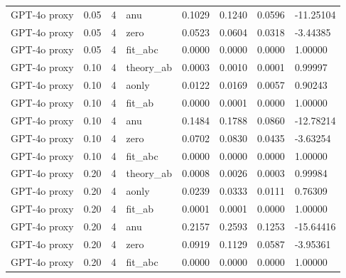\begin{tabular}{llllllll}
GPT-4o proxy & 0.05 & 4 & anu & 0.1029 & 0.1240 & 0.0596 & -11.25104 \\
GPT-4o proxy & 0.05 & 4 & zero & 0.0523 & 0.0604 & 0.0318 & -3.44385 \\
GPT-4o proxy & 0.05 & 4 & fit\_abc & 0.0000 & 0.0000 & 0.0000 & 1.00000 \\
GPT-4o proxy & 0.10 & 4 & theory\_ab & 0.0003 & 0.0010 & 0.0001 & 0.99997 \\
GPT-4o proxy & 0.10 & 4 & aonly & 0.0122 & 0.0169 & 0.0057 & 0.90243 \\
GPT-4o proxy & 0.10 & 4 & fit\_ab & 0.0000 & 0.0001 & 0.0000 & 1.00000 \\
GPT-4o proxy & 0.10 & 4 & anu & 0.1484 & 0.1788 & 0.0860 & -12.78214 \\
GPT-4o proxy & 0.10 & 4 & zero & 0.0702 & 0.0830 & 0.0435 & -3.63254 \\
GPT-4o proxy & 0.10 & 4 & fit\_abc & 0.0000 & 0.0000 & 0.0000 & 1.00000 \\
GPT-4o proxy & 0.20 & 4 & theory\_ab & 0.0008 & 0.0026 & 0.0003 & 0.99984 \\
GPT-4o proxy & 0.20 & 4 & aonly & 0.0239 & 0.0333 & 0.0111 & 0.76309 \\
GPT-4o proxy & 0.20 & 4 & fit\_ab & 0.0001 & 0.0001 & 0.0000 & 1.00000 \\
GPT-4o proxy & 0.20 & 4 & anu & 0.2157 & 0.2593 & 0.1253 & -15.64416 \\
GPT-4o proxy & 0.20 & 4 & zero & 0.0919 & 0.1129 & 0.0587 & -3.95361 \\
GPT-4o proxy & 0.20 & 4 & fit\_abc & 0.0000 & 0.0000 & 0.0000 & 1.00000 \\
\bottomrule
\end{tabular}
